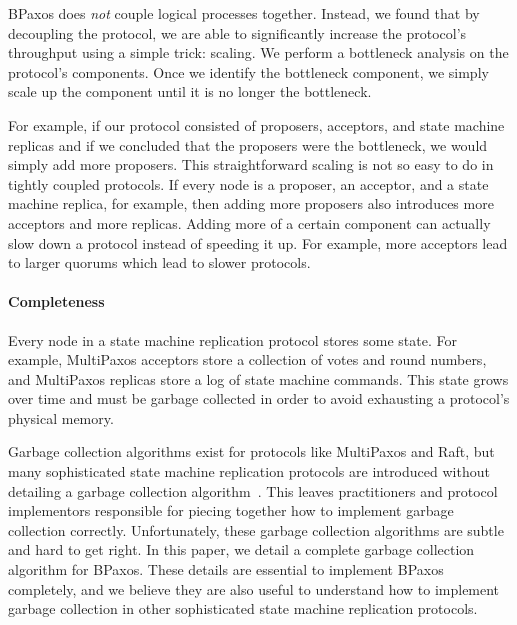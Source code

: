 BPaxos does \emph{not} couple logical processes together. Instead, we found
that by decoupling the protocol, we are able to significantly increase the
protocol's throughput using a simple trick: scaling. We perform a bottleneck
analysis on the protocol's components. Once we identify the bottleneck
component, we simply scale up the component until it is no longer the
bottleneck.

For example, if our protocol consisted of proposers, acceptors, and state
machine replicas and if we concluded that the proposers were the bottleneck, we
would simply add more proposers. This straightforward scaling is not so easy to
do in tightly coupled protocols. If every node is a proposer, an acceptor, and
a state machine replica, for example, then adding more proposers also
introduces more acceptors and more replicas. Adding more of a certain component
can actually slow down a protocol instead of speeding it up. For example, more
acceptors lead to larger quorums which lead to slower protocols.

\paragraph{Completeness}
Every node in a state machine replication protocol stores some state. For
example, MultiPaxos acceptors store a collection of votes and round numbers,
and MultiPaxos replicas store a log of state machine commands. This state grows
over time and must be garbage collected in order to avoid exhausting a
protocol's physical memory.

Garbage collection algorithms exist for protocols like MultiPaxos and Raft, but
many sophisticated state machine replication protocols are introduced without
detailing a garbage collection algorithm~\cite{%
  moraru2013there, %
  arun2017speeding, %
  zhang2018building, %
  mu2016consolidating %
}. This leaves practitioners and protocol implementors responsible for piecing
together how to implement garbage collection correctly. Unfortunately, these
garbage collection algorithms are subtle and hard to get right. In this paper,
we detail a complete garbage collection algorithm for BPaxos. These details are
essential to implement BPaxos completely, and we believe they are also useful
to understand how to implement garbage collection in other sophisticated state
machine replication protocols.

